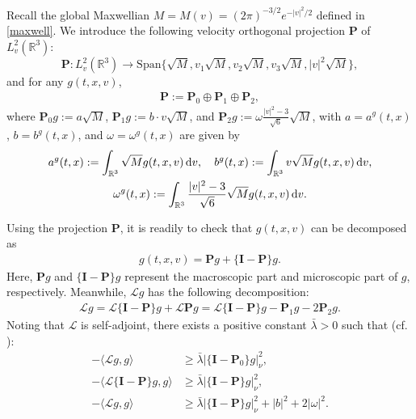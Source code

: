 \documentclass[reqno,11pt]{amsart}
\theoremstyle{plain}
\numberwithin{equation}{section}
\begin{document}
Recall the global  Maxwellian $M =M(v)=(2\pi)^{- {3}/{2}}e^{- {|v|^2}/{2}}$ defined in \eqref{maxwell}.     
We introduce   the following velocity orthogonal projection $\mathbf{P}$ of $L_{v}^{2}(\mathbb{R}^3)$:  
\begin{equation*}  
\mathbf{P}: L_{v}^{2}(\mathbb{R}^3) \to \mathrm{Span}\{\sqrt{M}, v_{1}\sqrt{M}, v_{2}\sqrt{M}, v_{3}\sqrt{M}, |v|^2\sqrt{M}\},  
\end{equation*}  
and  for any $g(t,x,v) $,
\begin{align*}  
\mathbf{P} := \mathbf{P}_{0} \oplus \mathbf{P}_{1} \oplus \mathbf{P}_{2},  
\end{align*}  
where $\mathbf{P}_{0}g := a\sqrt{M}$, $\mathbf{P}_{1}g := b \cdot v\sqrt{M}$, and $\mathbf{P}_{2}g := \omega\frac{|v|^2-3}{\sqrt{6}}\sqrt{M}$, with 
  $a = a^g(t,x)$, $b = b^g(t,x)$, and $\omega = \omega^g(t,x)$ are given by  
\begin{gather*} 
a^g(t,x)   := \int_{\mathbb{R}^3} \sqrt{M} g(t,x,v) \, {\rm d}v,  \quad 
b^g(t,x)   := \int_{\mathbb{R}^3} v \sqrt{M} g(t,x,v) \, {\rm d}v, \\ 
\omega^g(t,x)   := \int_{\mathbb{R}^3} \frac{|v|^2 - 3}{\sqrt{6}} \sqrt{M} g(t,x,v) \, {\rm d}v. 
\end{gather*}


Using the projection $\mathbf{P}$, it is readily to check that $g(t,x,v) $ 
  can be decomposed as 
\begin{align}\label{G2.4}  
g(t,x,v) = \mathbf{P}g + \{\mathbf{I}-\mathbf{P}\}g.  
\end{align}  
Here, $\mathbf{P}g$ and $\{\mathbf{I}-\mathbf{P}\}g$ represent the macroscopic part and   microscopic part
of $g$, respectively. Meanwhile, $\mathcal{L}g$ has the following decomposition:  
\begin{align}\label{G2.5}  
\mathcal{L}g = \mathcal{L}\{\mathbf{I}-\mathbf{P}\}g + \mathcal{L}\mathbf{P}g = \mathcal{L}\{\mathbf{I}-\mathbf{P}\}g - \mathbf{P}_{1}g - 2\mathbf{P}_{2}g.  
\end{align}  
Noting that $\mathcal{L}$ is self-adjoint, there exists a positive constant $\bar\lambda > 0$ such that (cf. \cite{Mu-Wang-20,DFT-2010-CMP,LNW-SAPM-2025,CDM-krm-2011}):  
\begin{align} 
-\langle \mathcal{L}g, g\rangle &\geq \bar\lambda|\{\mathbf{I}-\mathbf{P}_0\}g|_{\nu}^{2}, \label{G2.6a}  \\  
-\langle \mathcal{L}\{\mathbf{I}-\mathbf{P}\}g,g\rangle &\geq \bar\lambda|\{\mathbf{I}-\mathbf{P}\}g|_{\nu}^{2}, \label{G2.6b}  \\  
-\langle \mathcal{L}g, g\rangle &\geq \bar\lambda |\{\mathbf{I}-\mathbf{P}\}g|_{\nu}^{2} + |b|^{2} + 2|\omega|^2.\label{G2.6}  
\end{align}
\end{document}

